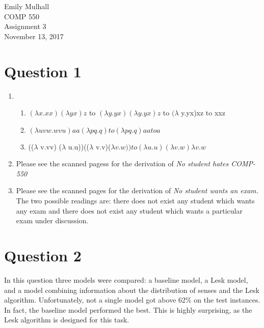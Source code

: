 \documentclass{article}
\begin{document}
\noindent Emily Mulhall\\
COMP 550\\
Assignment 3\\
November 13, 2017\\

\section*{Question 1}
\begin{enumerate}
\item 
	\begin{enumerate}
		\item $( \lambda x.xx)(\lambda yx)z$ to $(\lambda y.yx) (\lambda y.yx)z$ to $(\lambda$ y.yx)xz to xxz
		\item $(\lambda uvw.wvu)aa(\lambda pq.q) to (\lambda pq.q)aa to a$
		\item (($\lambda$ v.vv) ($\lambda$ u.u))(($\lambda$ v.v)($\lambda v.w)) to (\lambda u.u)(\lambda v.w)\lambda v.w$
	\end{enumerate}
\item Please see the scanned pagess for the derivation of \textit{No student hates COMP-550}
\item Please see the scanned pages for the derivation of \textit{No student wants an exam.}  The two possible readings are: there does not exist any student which wants any exam and there does not exist any student which wants a particular exam under discussion.
\end{enumerate}

\section*{Question 2}
In this question three models were compared: a baseline model, a Lesk model, and a model combining information about the distribution of senses and the Lesk algorithm.  Unfortunately, not a single model got above 62\% on the test instances. In fact, the baseline model performed the best.  This is highly surprising, as the Lesk algorithm is designed for this task.
\end{document}
